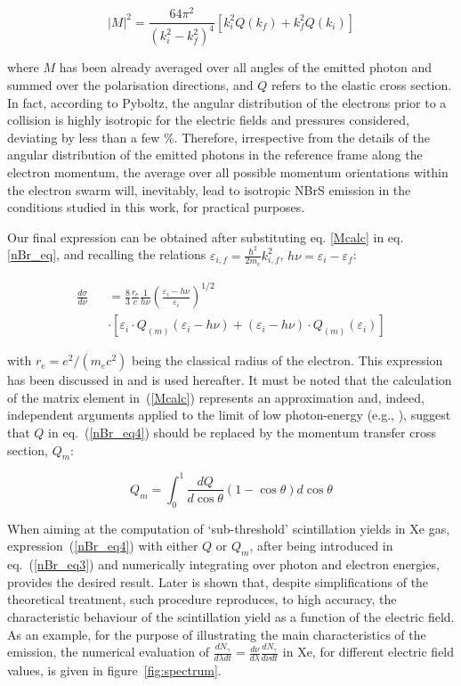 \documentclass[%
 reprint,
superscriptaddress,
 amsmath,amssymb,
 aps,
]{revtex4-2}
\begin{document}
\begin{equation}
|M|^2 = \frac{64\pi^2}{(k_i^2 - k_f^2)^4} [k_i^2 Q(k_f) + k_f^2 Q(k_i)] \label{Mcalc}
\end{equation}

\noindent where $M$ has been already averaged over all angles of the emitted photon and summed over the polarisation directions, and $Q$ refers to the elastic cross section. In fact, according to Pyboltz, the angular distribution of the electrons prior to a collision is highly isotropic for the electric fields and pressures considered, deviating by less than a few \%. Therefore, irrespective from the details of the angular distribution of the emitted photons in the reference frame along the electron momentum, the average over all possible momentum orientations within the electron swarm will, inevitably, lead to isotropic NBrS emission in the conditions studied in this work, for practical purposes. 

Our final expression can be obtained after substituting eq. \ref{Mcalc} in eq. \ref{nBr_eq}, and recalling the relations $\varepsilon_{i,f} = \frac{\hbar^2}{2m_e}k_{i,f}^2$, $h\nu = \varepsilon_i - \varepsilon_f$:

\begin{eqnarray}
\frac{d\sigma}{d\nu} &&= \frac{8}{3}\frac{r_e}{c}\frac{1}{h\nu}\left(\frac{\varepsilon_i-h\nu}{\varepsilon_i}\right)^{1/2} \nonumber\\
&&\cdot \left[\varepsilon_i \cdot{Q_{(m)}}(\varepsilon_i-h\nu) + (\varepsilon_i - h\nu)\cdot{Q_{(m)}}(\varepsilon_i) \right]\label{nBr_eq4}
\end{eqnarray}

\noindent with $r_e = e^2/(m_e c^2)$ being the classical radius of the electron. This expression has been discussed in \cite{34, nBrPlasma} and is used hereafter. It must be noted that the calculation of the matrix element in~(\ref{Mcalc}) represents an approximation and, indeed, independent arguments applied to the limit of low photon-energy (e.g., \cite{Low}), suggest that $Q$ in eq.~(\ref{nBr_eq4}) should be replaced by the momentum transfer cross section, $Q_m$: 


\begin{equation}
Q_m = \int_0^1 \frac{dQ}{d\cos\theta}(1-\cos\theta)d\cos{\theta}  
\label{eq_1}
\end{equation}

When aiming at the computation of `sub-threshold' scintillation yields in Xe gas, expression~(\ref{nBr_eq4}) with either $Q$ or $Q_m$, after being introduced in eq.~(\ref{nBr_eq3}) and numerically integrating over photon and electron energies, provides the desired result. Later is shown that, despite simplifications of the theoretical treatment, such procedure reproduces, to high accuracy, the characteristic behaviour of the scintillation yield as a function of the electric field. As an example, for the purpose of illustrating the main characteristics of the emission, the numerical evaluation of $\frac{dN_\gamma}{d\lambda dt}=\frac{d\nu}{d\lambda}\frac{dN_\gamma}{d\nu dt}$ in Xe, for different electric field values, is given in figure~\ref{fig:spectrum}.
\end{document}
